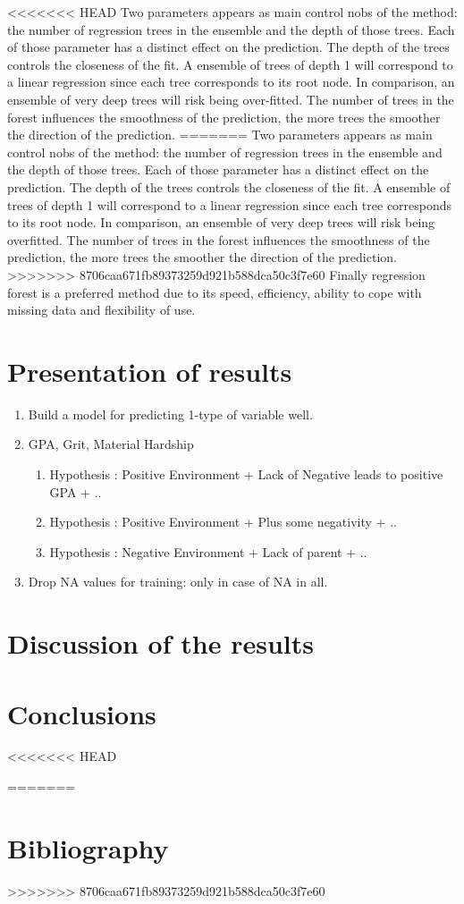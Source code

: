 \documentclass{article} %
\begin{document}
<<<<<<< HEAD
Two parameters appears as main control nobs of the method: the number of regression trees in the ensemble and the depth of those trees. Each of those parameter has a distinct effect on the prediction. The depth of the trees controls the closeness of the fit. A ensemble of trees of depth 1 will correspond to a linear regression since each tree corresponds to its root node. In comparison, an ensemble of very deep trees will risk being over-fitted. The number of trees in the forest influences the smoothness of the prediction, the more trees the smoother the direction of the prediction. 
=======
Two parameters appears as main control nobs of the method: the number of regression trees in the ensemble and the depth of those trees. Each of those parameter has a distinct effect on the prediction. The depth of the trees controls the closeness of the fit. A ensemble of trees of depth 1 will correspond to a linear regression since each tree corresponds to its root node. In comparison, an ensemble of very deep trees will risk being overfitted. The number of trees in the forest influences the smoothness of the prediction, the more trees the smoother the direction of the prediction. 
>>>>>>> 8706caa671fb89373259d921b588dca50c3f7e60
Finally regression forest is a preferred method due to its speed, efficiency, ability to cope with missing data and flexibility of use. 
\section{Presentation of results}

\begin{enumerate}
	\item Build a model for predicting 1-type of variable well.
	\item GPA, Grit, Material Hardship
	\begin{enumerate}
		\item Hypothesis : Positive Environment + Lack of Negative leads to positive GPA + ..
		\item Hypothesis : Positive Environment + Plus some negativity + ..
		\item Hypothesis : Negative Environment + Lack of parent + ..
	\end{enumerate}
	\item Drop NA values for training: only in case of NA in all.
\end{enumerate}
\section{Discussion of the results}
\section{Conclusions}
<<<<<<< HEAD



=======
\section{Bibliography}
>>>>>>> 8706caa671fb89373259d921b588dca50c3f7e60


\end{document}
